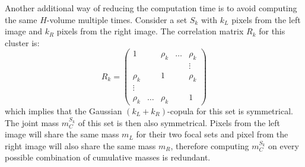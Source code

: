 Another additional way of reducing the computation time is to avoid computing the same $H$-volume multiple times. Consider a set $S_k$ with $k_L$ pixels from the left image and $k_R$ pixels from the right image. The correlation matrix $R_k$ for this cluster is:
\begin{equation}
    R_k=\begin{pmatrix}
        1 &  & \rho_k & \ldots & \rho_k\\
         & & & & \vdots\\
        \rho_k &  & 1 & & \rho_k\\
        \vdots &  &  & & \\
        \rho_k & \ldots & \rho_k &  & 1
    \end{pmatrix}\label{eq:corr_matrix_sym}
\end{equation}
which implies that the Gaussian $(k_L+k_R)$-copula for this set is symmetrical. The joint mass $m^{S_k}_C$ of this set is then also symmetrical. Pixels from the left image will share the same mass $m_L$ for their two focal sets and pixel from the right image will also share the same mass $m_R$, therefore computing $m^{S_k}_C$ on every possible combination of cumulative masses is redundant. 
